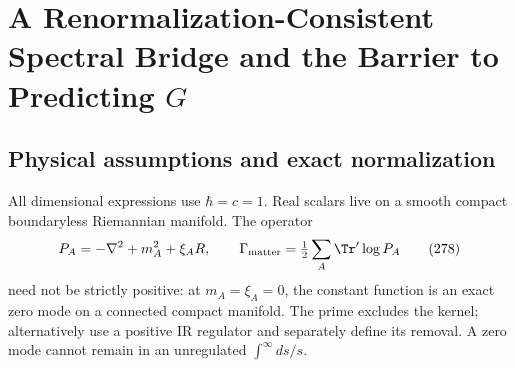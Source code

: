 \documentclass[11pt,a4paper,oneside]{book}
\begin{document}
\chapter{A Renormalization-Consistent Spectral Bridge and the Barrier to Predicting $G$}
\section{Physical assumptions and exact normalization}
All dimensional expressions use $\hbar=c=1$. Real scalars live on a smooth compact boundaryless Riemannian manifold. The operator
\begin{equation}P_A=-\nabla^2+m_A^2+\xi_AR,\qquad\Gamma_{\rm matter}=\tfrac12\sum_A\Tr'\log P_A\tag{278}\end{equation}
need not be strictly positive: at $m_A=\xi_A=0$, the constant function is an exact zero mode on a connected compact manifold. The prime excludes the kernel; alternatively use a positive IR regulator and separately define its removal. A zero mode cannot remain in an unregulated $\int^\infty ds/s$.
\end{document}
